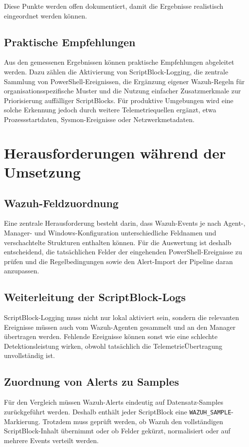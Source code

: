 \documentclass[12pt,a4paper,oneside,parskip=half]{scrreprt}
\begin{document}
Diese Punkte werden offen dokumentiert, damit die Ergebnisse realistisch eingeordnet werden können.

\section{Praktische Empfehlungen}
Aus den gemessenen Ergebnissen können praktische Empfehlungen abgeleitet werden. Dazu zählen die Aktivierung von ScriptBlock-Logging, die zentrale Sammlung von PowerShell-Ereignissen, die Ergänzung eigener Wazuh-Regeln für organisationsspezifische Muster und die Nutzung einfacher Zusatzmerkmale zur Priorisierung auffälliger ScriptBlocks. Für produktive Umgebungen wird eine solche Erkennung jedoch durch weitere Telemetriequellen ergänzt, etwa Prozessstartdaten, Sysmon-Ereignisse oder Netzwerkmetadaten.

\chapter{Herausforderungen während der Umsetzung}

\section{Wazuh-Feldzuordnung}
Eine zentrale Herausforderung besteht darin, dass Wazuh-Events je nach Agent-, Manager- und Windows-Konfiguration unterschiedliche Feldnamen und verschachtelte Strukturen enthalten können. Für die Auswertung ist deshalb entscheidend, die tatsächlichen Felder der eingehenden PowerShell-Ereignisse zu prüfen und die Regelbedingungen sowie den Alert-Import der Pipeline daran anzupassen.

\section{Weiterleitung der ScriptBlock-Logs}
ScriptBlock-Logging muss nicht nur lokal aktiviert sein, sondern die relevanten Ereignisse müssen auch vom Wazuh-Agenten gesammelt und an den Manager übertragen werden. Fehlende Ereignisse können sonst wie eine schlechte Detektionsleistung wirken, obwohl tatsächlich die TelemetrieÜbertragung unvollständig ist.

\section{Zuordnung von Alerts zu Samples}
Für den Vergleich müssen Wazuh-Alerts eindeutig auf Datensatz-Samples zurückgeführt werden. Deshalb enthält jeder ScriptBlock eine \texttt{WAZUH\_SAMPLE}-Markierung. Trotzdem muss geprüft werden, ob Wazuh den vollständigen ScriptBlock-Inhalt übernimmt oder ob Felder gekürzt, normalisiert oder auf mehrere Events verteilt werden.
\end{document}
